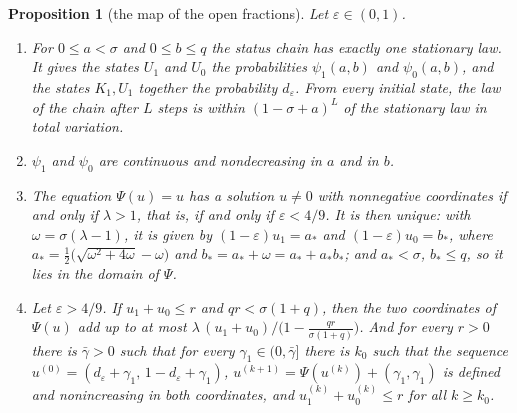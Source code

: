 \documentclass[11pt]{amsart}
\newtheorem{proposition}[theorem]{Proposition}
\theoremstyle{definition}
\theoremstyle{remark}
\newcommand{\eps}{\varepsilon}
\begin{document}
\begin{proposition}[the map of the open fractions]\label{prop:psi}
Let $\eps\in(0,1)$.
\begin{enumerate}[label=(\alph*),leftmargin=2.4em]
\item For $0\le a<\sigma$ and $0\le b\le q$ the status chain has exactly one stationary law. It
gives the states $U_1$ and $U_0$ the probabilities $\psi_1(a,b)$ and $\psi_0(a,b)$, and the states
$K_1,U_1$ together the probability $d_\eps$. From every initial state, the law of the chain after
$L$ steps is within $(1-\sigma+a)^L$ of the stationary law in total variation.
\item $\psi_1$ and $\psi_0$ are continuous and nondecreasing in $a$ and in $b$.
\item The equation $\Psi(u)=u$ has a solution $u\ne0$ with nonnegative coordinates if and only if
$\lambda>1$, that is, if and only if $\eps<4/9$. It is then unique: with
$\omega=\sigma(\lambda-1)$, it is given by $(1-\eps)u_1=a_*$ and $(1-\eps)u_0=b_*$, where
$a_*=\frac12\bigl(\sqrt{\omega^2+4\omega}-\omega\bigr)$ and $b_*=a_*+\omega=a_*+a_*b_*$; and
$a_*<\sigma$, $b_*\le q$, so it lies in the domain of $\Psi$.
\item Let $\eps>4/9$. If $u_1+u_0\le r$ and $qr<\sigma(1+q)$, then the two coordinates of
$\Psi(u)$ add up to at most $\lambda\,(u_1+u_0)\big/\bigl(1-\frac{qr}{\sigma(1+q)}\bigr)$. And
for every $r>0$ there is $\bar\gamma>0$ such that for every $\gamma_1\in(0,\bar\gamma]$ there is
$k_0$ such that the sequence $u^{(0)}=(d_\eps+\gamma_1,\,1-d_\eps+\gamma_1)$,
$u^{(k+1)}=\Psi(u^{(k)})+(\gamma_1,\gamma_1)$ is defined and nonincreasing in both coordinates, and
$u^{(k)}_1+u^{(k)}_0\le r$ for all $k\ge k_0$.
\end{enumerate}
\end{proposition}
\end{document}
